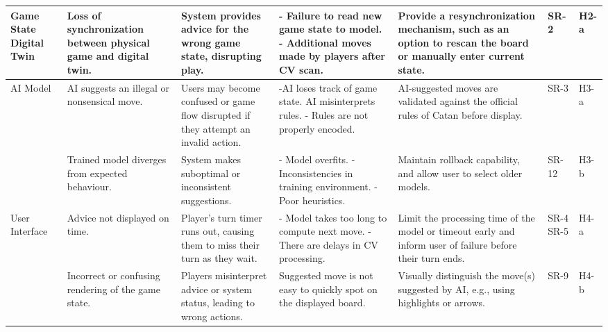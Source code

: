 \documentclass{article}
\begin{document}
\begin{landscape}
\begin{tabularx}{\linewidth}{|P{2.5cm}|Y|Y|Y|Y|P{1cm}|P{1cm}|}
        \hline

        Game State Digital Twin &
        Loss of synchronization between physical game and digital twin. &
        System provides advice for the wrong game state, disrupting play. &
        - Failure to read new game state to model. \newline - Additional moves made by players after CV scan. &
        Provide a resynchronization mechanism, such as an option to rescan the board or manually enter current state. &
        SR-2 &
        H2-a \\

        \hline

        AI Model &
        AI suggests an illegal or nonsensical move. &
        Users may become confused or game flow disrupted if they attempt an invalid action. &
        -AI loses track of game state. \newline AI misinterprets rules. \newline - Rules are not properly encoded. &
        AI-suggested moves are validated against the official rules of Catan before display. &
        SR-3 &
        H3-a \\

        &
        Trained model diverges from expected behaviour. &
        System makes suboptimal or inconsistent suggestions. &
        - Model overfits. \newline - Inconsistencies in training environment. \newline - Poor heuristics. &
        Maintain rollback capability, and allow user to select older models. &
        SR-12 &
        H3-b \\


        \hline

        User Interface &
        Advice not displayed on time. &
        Player's turn timer runs out, causing them to miss their turn as they wait. &
        - Model takes too long to compute next move. \newline - There are delays in CV processing. &
        Limit the processing time of the model or timeout early and inform user of failure before their turn ends. &
        SR-4 \newline SR-5 &
        H4-a \\

        &
        Incorrect or confusing rendering of the game state. &
        Players misinterpret advice or system status, leading to wrong actions. &
        Suggested move is not easy to quickly spot on the displayed board. &
        Visually distinguish the move(s) suggested by AI, e.g., using highlights or arrows. &
        SR-9 &
        H4-b \\


\end{tabularx}
\end{landscape}
\end{document}
